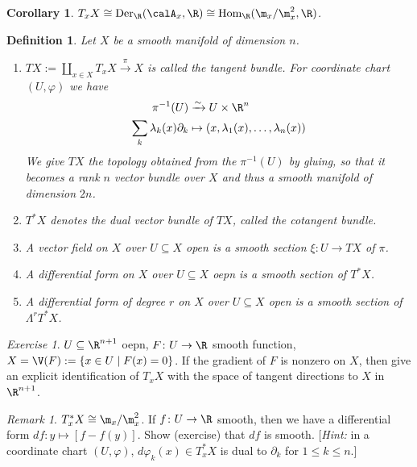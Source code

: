\documentclass[A4paper, british]{amsart}
\theoremstyle{darkgreentheorem}
\newtheorem{cor}[thm]{Corollary}
\theoremstyle{darkbluedefinition}
\newtheorem{defn}[thm]{Definition}
\theoremstyle{darkredexample}
\theoremstyle{remark}
\newtheorem{rem}[thm]{Remark}
\newtheorem{exe}[thm]{Exercise}
\DeclareMathOperator{\Hom}{Hom}
\DeclareMathOperator{\Der}{Der}
\newcommand{\1}{\mathbbm{1}}
\newcommand{\tms}{\times}
\newcommand{\sub}{\subseteq}
\begin{document}
\begin{cor}
    $T_{x}X\cong \Der_{\R}(\calA_{x},\R)\cong \Hom_{\R}(\m_{x}/\m_{x}^{2},\R)$.
\end{cor}

\begin{defn}
    Let $X$ be a smooth manifold of dimension $n$.
    \begin{enumerate}
	\item $TX:=\coprod_{x\in X}T_{x}X\xrightarrow{\pi}X$ is called the \textit{tangent bundle}.
	    For coordinate chart $(U,\varphi)$ we have
	    \begin{align*}
		\pi^{-1}(U)&\xrightarrow{\sim} U\tms \R^{n}\\
		\sum_{k}\lambda_{k}(x)\partial_{k}&\mapsto (x,\lambda_{1}(x),\ldots,\lambda_{n}(x))
	    \end{align*}
	    We give $TX$ the topology obtained from the $\pi^{-1}(U)$ by gluing, so that it becomes a rank $n$ vector bundle over $X$ and thus a smooth manifold of dimension $2n$.
	\item $T^{*}X$ denotes the dual vector bundle of $TX$, called the \textit{cotangent bundle}.
	\item A \textit{vector field} on $X$ over $U\sub X$ open is a smooth section $\xi\colon U\to TX$ of $\pi$.
	\item A \textit{differential form} on $X$ over $U\sub X$ oepn is a smooth section of $T^{*}X$.
	\item A \textit{differential form} of degree $r$ on $X$ over $U\sub X$ open is a smooth section of $\Lambda^{r}T^{*}X$.
    \end{enumerate}
\end{defn}

\begin{exe}
    $U\sub \R^{n+1}$ oepn, $F\colon U\to \R$ smooth function, $X=\V(F):=\{ x\in U\mid F(x)=0\}$.
    If the gradient of $F$ is nonzero on $X$, then give an explicit identification of $T_{x}X$ with the space of tangent directions to $X$ in $\R^{n+1}$.
\end{exe}

\begin{rem}
    $T_{x}^{*}X\cong \m_{x}/\m_{x}^{2}$.
    If $f\colon U\to \R$ smooth, then we have a differential form $df\colon y\mapsto [f-f(y)]$.
    Show (exercise) that $df$ is smooth.
    [\textit{Hint:} in a coordinate chart $(U,\varphi)$, $d\varphi_{k}(x)\in T_{x}^{*}X$ is dual to $\partial_{k}$ for $1\leqslant k\leqslant n$.]
\end{rem}
\end{document}
